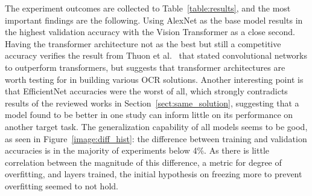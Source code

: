 \documentclass[english,twoside,openright]{UH_DS_MSc}
\begin{document}
The experiment outcomes are collected to Table~\ref{table:results}, and 
the most important findings are the following. Using AlexNet as the base model results in the highest 
validation accuracy with the Vision Transformer as a close second. Having the transformer 
architecture not as the best but still a competitive accuracy verifies the result 
from Thuon et al.~\cite{9thuonPalm} that stated convolutional networks to outperform transformers, but suggests 
that transformer architectures are worth testing for in building various OCR
solutions. Another interesting point is that EfficientNet accuracies were the worst of all, 
which strongly contradicts results of the reviewed works in Section~\ref{sect:same_solution},
suggesting that a model found to be better in one study can inform little on its performance on another target task.
The generalization capability of all models seems to be good, as seen in Figure~\ref{image:diff_hist}:
the difference between training and validation accuracies is in the majority of 
experiments below 4\%. As there is little correlation between the magnitude of this difference, 
a metric for degree of overfitting, and layers trained, the initial hypothesis on freezing more to prevent overfitting
seemed to not hold.
\end{document}
